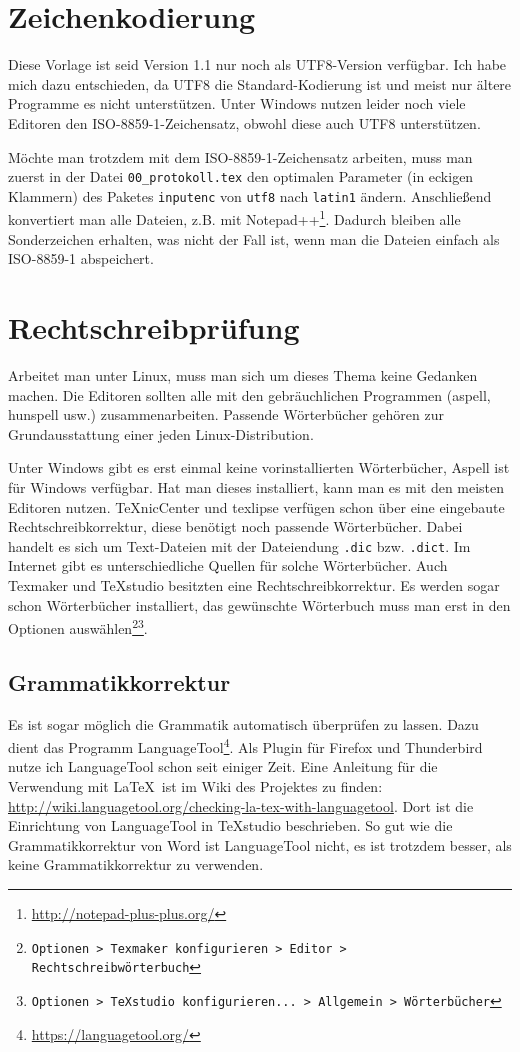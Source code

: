 \section{Zeichenkodierung}

Diese Vorlage ist seid Version 1.1 nur noch als UTF8-Version verfügbar. Ich habe mich dazu entschieden, da UTF8 die Standard-Kodierung ist und meist nur ältere Programme es nicht unterstützen. Unter Windows nutzen leider noch viele Editoren den ISO-8859-1-Zeichensatz, obwohl diese auch UTF8 unterstützen.

Möchte man trotzdem mit dem ISO-8859-1-Zeichensatz arbeiten, muss man zuerst in der Datei \verb|00_protokoll.tex| den optimalen Parameter (in eckigen Klammern) des Paketes \verb|inputenc| von \verb|utf8| nach \verb|latin1| ändern. Anschließend konvertiert man alle Dateien, z.B. mit Notepad++\footnote{\url{http://notepad-plus-plus.org/}}. Dadurch bleiben alle Sonderzeichen erhalten, was nicht der Fall ist, wenn man die Dateien einfach als ISO-8859-1 abspeichert.

\section{Rechtschreibprüfung}

Arbeitet man unter Linux, muss man sich um dieses Thema keine Gedanken machen. Die Editoren sollten alle mit den gebräuchlichen Programmen (aspell, hunspell usw.) zusammenarbeiten. Passende Wörterbücher gehören zur Grundausstattung einer jeden Linux-Distribution.

Unter Windows gibt es erst einmal keine vorinstallierten Wörterbücher, Aspell ist für Windows verfügbar. Hat man dieses installiert, kann man es mit den meisten Editoren nutzen. TeXnicCenter und texlipse verfügen schon über eine eingebaute Rechtschreibkorrektur, diese benötigt noch passende Wörterbücher. Dabei handelt es sich um Text-Dateien mit der Dateiendung \verb|.dic| bzw. \verb|.dict|. Im Internet gibt es unterschiedliche Quellen für solche Wörterbücher. Auch Texmaker und TeXstudio besitzten eine Rechtschreibkorrektur. Es werden sogar schon Wörterbücher installiert, das gewünschte Wörterbuch muss man erst in den Optionen auswählen\footnote{\texttt{Optionen > Texmaker konfigurieren > Editor > Rechtschreibwörterbuch}}\footnote{\texttt{Optionen > TeXstudio konfigurieren... > Allgemein > Wörterbücher}}.

\subsection{Grammatikkorrektur}

Es ist sogar möglich die Grammatik automatisch überprüfen zu lassen. Dazu dient das Programm LanguageTool\footnote{\url{https://languagetool.org/}}. Als Plugin für Firefox und Thunderbird nutze ich LanguageTool schon seit einiger Zeit. Eine Anleitung für die Verwendung mit \LaTeX\ ist im Wiki des Projektes zu finden: \url{http://wiki.languagetool.org/checking-la-tex-with-languagetool}. Dort ist die Einrichtung von LanguageTool in TeXstudio beschrieben. So gut wie die Grammatikkorrektur von Word ist LanguageTool nicht, es ist trotzdem besser, als keine Grammatikkorrektur zu verwenden.
